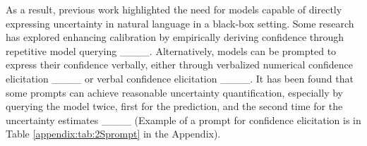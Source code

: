 
As a result, previous work highlighted the need for models capable of directly expressing uncertainty in natural language in a black-box setting. Some research has explored enhancing calibration by empirically deriving confidence through repetitive model querying ____. Alternatively, models can be prompted to express their confidence verbally, either through verbalized numerical confidence elicitation ____ or verbal confidence elicitation ____. It has been found that some prompts can achieve reasonable uncertainty quantification, especially by querying the model twice, first for the prediction, and the second time for the uncertainty estimates ____ (Example of a prompt for confidence elicitation is in Table \ref{appendix:tab:2Sprompt} in the Appendix).

 

